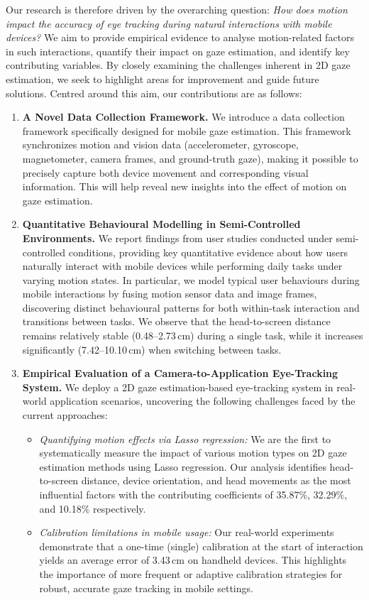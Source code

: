 Our research is therefore driven by the overarching question:
\emph{How does motion impact the accuracy of eye tracking during natural interactions with mobile devices?}
We aim to provide empirical evidence to analyse motion-related factors in such interactions, quantify their impact on gaze estimation, and identify key contributing variables.
By closely examining the challenges inherent in 2D gaze estimation, we seek to highlight areas for improvement and guide future solutions.
Centred around this aim, our contributions are as follows:
\begin{enumerate}
    \item \textbf{A Novel Data Collection Framework.} 
    We introduce a data collection framework specifically designed for mobile gaze estimation.
    This framework synchronizes motion and vision data (accelerometer, gyroscope, magnetometer, camera frames, and ground-truth gaze), making it possible to precisely capture both device movement and corresponding visual information. This will help reveal new insights into the effect of motion on gaze estimation.

    \item \textbf{Quantitative Behavioural Modelling in Semi-Controlled Environments.}
    We report findings from user studies conducted under semi-controlled conditions, providing key quantitative evidence about how users naturally interact with mobile devices while performing daily tasks under varying motion states.
    In particular, we model typical user behaviours during mobile interactions by fusing motion sensor data and image frames, discovering distinct behavioural patterns for both within-task interaction and transitions between tasks. We observe that
        the head-to-screen distance remains relatively stable (0.48--2.73\,cm) during a single task, while it increases significantly (7.42--10.10\,cm) when switching between tasks.

    \item \textbf{Empirical Evaluation of a Camera-to-Application Eye-Tracking System.}
   We deploy a 2D gaze estimation-based eye-tracking system in real-world application scenarios, uncovering the following challenges faced by the current approaches:
    
    \begin{itemize}
        \item \emph{Quantifying motion effects via Lasso regression:} 
        We are the first to systematically measure the impact of various motion types on 2D gaze estimation methods using Lasso regression.
        Our analysis identifies head-to-screen distance, device orientation, and head movements as the most influential factors with the contributing coefficients of  35.87\%,  32.29\%, and 10.18\% respectively.
        \item \emph{Calibration limitations in mobile usage:} 
        Our real-world experiments demonstrate that a one-time (single) calibration at the start of interaction yields an average error of 3.43\,cm on handheld devices.
        This highlights the importance of more frequent or adaptive calibration strategies for robust, accurate gaze tracking in mobile settings.
    \end{itemize}

\end{enumerate}


